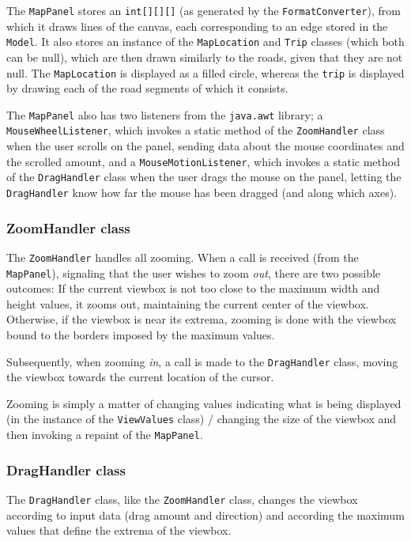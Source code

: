 The \texttt{MapPanel} stores an \texttt{int[][][]} (as generated by the \texttt{FormatConverter}), from which it draws lines of the canvas, each corresponding to an edge stored in the \texttt{Model}. It also stores an instance of the \texttt{MapLocation} and \texttt{Trip} classes (which both can be null), which are then drawn similarly to the roads, given that they are not null. The \texttt{MapLocation} is displayed as a filled circle, whereas the \texttt{trip} is displayed by drawing each of the road segments of which it consists.

The \texttt{MapPanel} also has two listeners from the \texttt{java.awt} library; a \\\texttt{MouseWheelListener}, which invokes a static method of the \texttt{ZoomHandler} class when the user scrolls on the panel, sending data about the mouse coordinates and the scrolled amount, and a \texttt{MouseMotionListener}, which invokes a static method of the \texttt{DragHandler} class when the user drags the mouse on the panel, letting the \texttt{DragHandler} know how far the mouse has been dragged (and along which axes).

\subsubsection{ZoomHandler class} %
The \texttt{ZoomHandler} handles all zooming. When a call is received (from the \texttt{MapPanel}), signaling that the user wishes to zoom \textsl{out}, there are two possible outcomes: If the current viewbox is not too close to the maximum width and height values, it zooms out, maintaining the current center of the viewbox. Otherwise, if the viewbox is near its extrema, zooming is done with the viewbox bound to the borders imposed by the maximum values.

Subsequently, when zooming \textsl{in}, a call is made to the \texttt{DragHandler} class, moving the viewbox towards the current location of the cursor.

Zooming is simply a matter of changing values indicating what is being displayed (in the instance of the \texttt{ViewValues} class) / changing the size of the viewbox and then invoking a repaint of the \texttt{MapPanel}.

\subsubsection{DragHandler class} %
The \texttt{DragHandler} class, like the \texttt{ZoomHandler} class, changes the viewbox according to input data (drag amount and direction) and according the maximum values that define the extrema of the viewbox.

